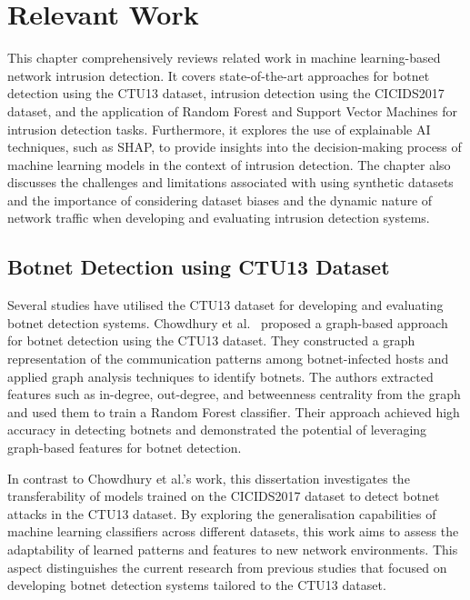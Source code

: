 \chapter{Relevant Work}\label{chap:relevant-work}

This chapter comprehensively reviews related work in machine learning-based network intrusion detection. It covers state-of-the-art approaches for botnet detection using the CTU13 dataset, intrusion detection using the CICIDS2017 dataset, and the application of Random Forest and Support Vector Machines for intrusion detection tasks. Furthermore, it explores the use of explainable AI techniques, such as SHAP, to provide insights into the decision-making process of machine learning models in the context of intrusion detection. The chapter also discusses the challenges and limitations associated with using synthetic datasets and the importance of considering dataset biases and the dynamic nature of network traffic when developing and evaluating intrusion detection systems.

\section{Botnet Detection using CTU13 Dataset}

Several studies have utilised the CTU13 dataset for developing and evaluating botnet detection systems. Chowdhury et al.~\cite{chowdhury2017botnet} proposed a graph-based approach for botnet detection using the CTU13 dataset. They constructed a graph representation of the communication patterns among botnet-infected hosts and applied graph analysis techniques to identify botnets. The authors extracted features such as in-degree, out-degree, and betweenness centrality from the graph and used them to train a Random Forest classifier. Their approach achieved high accuracy in detecting botnets and demonstrated the potential of leveraging graph-based features for botnet detection.

In contrast to Chowdhury et al.’s work, this dissertation investigates the transferability of models trained on the CICIDS2017 dataset to detect botnet attacks in the CTU13 dataset. By exploring the generalisation capabilities of machine learning classifiers across different datasets, this work aims to assess the adaptability of learned patterns and features to new network environments. This aspect distinguishes the current research from previous studies that focused on developing botnet detection systems tailored to the CTU13 dataset.

